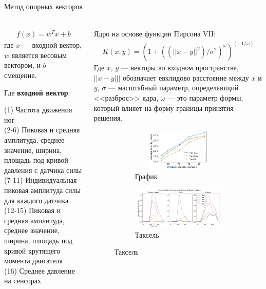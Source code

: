 \documentclass[aspectratio=169,xcolor=table,10pt]{beamer}
\begin{document}
\begin{frame}[t]{Метод опорных векторов}
\framesubtitle{}
\small
\begin{columns}[T,onlytextwidth]
    \begin{column}{0.49\textwidth}
        \vspace{-0.5cm}
        \begin{align}
            f(x) = w^T x + b
        \end{align}
        где $x$ --- входной вектор, $w$ является весовым вектором, и $b$ --- смещение.

        Где \textbf{входной вектор}:

        (1) Частота движения ног\\
        (2-6) Пиковая и средняя амплитуда, среднее значение, ширина, площадь под кривой давления с датчика силы\\
        (7-11) Индивидуальная пиковая амплитуда силы для каждого датчика\\
        (12-15) Пиковая и средняя амплитуда, среднее значение, ширина, площадь под кривой  крутящего момента двигателя\\
        (16) Среднее давление на сенсорах
    \end{column}
    \begin{column}{0.49\textwidth}
        Ядро на основе функции Пирсона VII:
\begin{align}
    K(x, y) = (1 + ((||x - y||^2)/\sigma^2)^\omega)^{(-1/\omega)}
\end{align}
Где $x$, $y$ --- векторы во входном пространстве, $||x - y|||$ обозначает евклидово расстояние между $x$ и $y$, $\sigma$ --- масштабный параметр, определяющий <<разброс>> ядра, $\omega$ --- это параметр формы, который влияет на форму границы принятия решения.

\begin{figure}[H]
    \begin{subfigure}{0.49\textwidth}
        \centering\includegraphics[height=2cm,width=1\textwidth,keepaspectratio]{../images/s_shape_leg/avg_lin_vel_rev_min.png}
        \caption{График}
    \end{subfigure}
    \begin{subfigure}{0.49\textwidth}
        \centering\includegraphics[height=2cm,width=1\textwidth,keepaspectratio]{../images/s_shape_leg/TaxelIndForce.png}
        \caption{Таксель}
    \end{subfigure}
\end{figure}
    \end{column}
\end{columns}

    
\end{frame}
\end{document}

